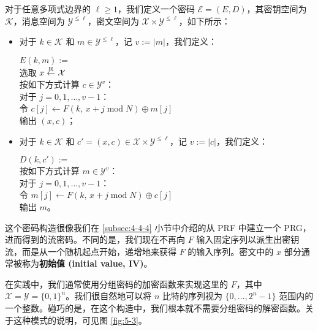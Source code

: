对于任意多项式边界的 $\ell\geq1$，我们定义一个密码 $\mathcal{E}=(E,D)$，其密钥空间为 $\mathcal{K}$，消息空间为 $\mathcal{Y}^{\leq\ell}$，密文空间为 $\mathcal{X}\times\mathcal{Y}^{\leq\ell}$，如下所示：
\begin{itemize}
	\item 对于 $k\in\mathcal{K}$ 和 $m\in\mathcal{Y}^{\leq\ell}$，记 $v:=|m|$，我们定义：
	
	\hspace*{20pt} $E(k,m):=$\\
	\hspace*{50pt} 选取 $x\overset{\rm R}\leftarrow\mathcal{X}$\\
	\hspace*{50pt} 按如下方式计算 $c\in\mathcal{Y}^v$：\\
	\hspace*{75pt} 对于 $j=0,1,\dots,v-1$：\\
	\hspace*{100pt} 令 $c[j]\leftarrow F(k,\,x+j\;\mathrm{mod}\;N)\oplus m[j]$\\
	\hspace*{50pt} 输出 $(x,c)$；
	\item 对于 $k\in\mathcal{K}$ 和 $c'=(x,c)\in\mathcal{X}\times\mathcal{Y}^{\leq\ell}$，记 $v:=|c|$，我们定义：
	
	\hspace*{20pt} $D(k,c'):=$\\
	\hspace*{50pt} 按如下方式计算 $m\in\mathcal{Y}^v$：\\
	\hspace*{75pt} 对于 $j=0,1,\dots,v-1$：\\
	\hspace*{100pt} 令 $m[j]\leftarrow F(k,\,x+j\;\mathrm{mod}\;N)\oplus c[j]$\\
	\hspace*{50pt} 输出 $m$。
\end{itemize}

这个密码构造很像我们在 \ref{subsec:4-4-4} 小节中介绍的从 PRF 中建立一个 PRG，进而得到的流密码。不同的是，我们现在不再向 $F$ 输入固定序列以派生出密钥流，而是从一个随机起点开始，递增地来获得 $F$ 的输入序列。密文中的 $x$ 部分通常被称为\textbf{初始值 (initial value, IV)}。

在实践中，我们通常使用分组密码的加密函数来实现这里的 $F$，其中 $\mathcal{X}=\mathcal{Y}=\{0,1\}^n$。我们很自然地可以将 $n$ 比特的序列视为 $\{0,\dots,2^n-1\}$ 范围内的一个整数。碰巧的是，在这个构造中，我们根本就不需要分组密码的解密函数。关于这种模式的说明，可见图 \ref{fig:5-3}。

